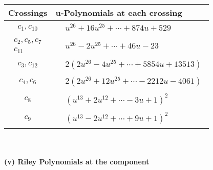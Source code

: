 \documentclass[1p]{elsarticle_modified}
\theoremstyle{definition}
\begin{document}
\begin{tabular}{m{50pt}|m{274pt}}
Crossings & \hspace{64pt}u-Polynomials at each crossing \\
\hline $$\begin{aligned}c_{1},c_{10}\end{aligned}$$&$\begin{aligned}
&u^{26}+16 u^{25}+\cdots+874 u+529
\end{aligned}$\\
\hline $$\begin{aligned}c_{2},c_{5},c_{7}\\c_{11}\end{aligned}$$&$\begin{aligned}
&u^{26}-2 u^{25}+\cdots+46 u-23
\end{aligned}$\\
\hline $$\begin{aligned}c_{3},c_{12}\end{aligned}$$&$\begin{aligned}
&2(2 u^{26}-4 u^{25}+\cdots+5854 u+13513)
\end{aligned}$\\
\hline $$\begin{aligned}c_{4},c_{6}\end{aligned}$$&$\begin{aligned}
&2(2 u^{26}+12 u^{25}+\cdots-2212 u-4061)
\end{aligned}$\\
\hline $$\begin{aligned}c_{8}\end{aligned}$$&$\begin{aligned}
&(u^{13}+2 u^{12}+\cdots-3 u+1)^{2}
\end{aligned}$\\
\hline $$\begin{aligned}c_{9}\end{aligned}$$&$\begin{aligned}
&(u^{13}-2 u^{12}+\cdots+9 u+1)^{2}
\end{aligned}$\\
\hline
\end{tabular}\\~\\
\newpage\renewcommand{\arraystretch}{1}
\flushleft \textbf{(v) Riley Polynomials at the component}\newline \\
\end{document}
